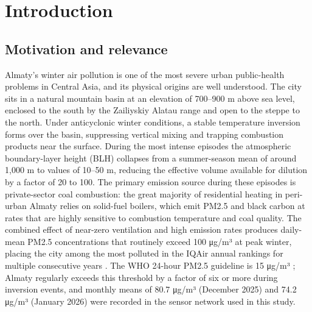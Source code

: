 \section{Introduction}\label{introduction}

\subsection{Motivation and relevance}\label{motivation-and-relevance}

Almaty's winter air pollution is one of the most severe urban public-health problems in Central Asia, and its physical origins are well understood. The city sits in a natural mountain basin at an elevation of 700--900 m above sea level, enclosed to the south by the Zailiyskiy Alatau range and open to the steppe to the north. Under anticyclonic winter conditions, a stable temperature inversion forms over the basin, suppressing vertical mixing and trapping combustion products near the surface. During the most intense episodes the atmospheric boundary-layer height (BLH) collapses from a summer-season mean of around 1,000 m to values of 10--50 m, reducing the effective volume available for dilution by a factor of 20 to 100. The primary emission source during these episodes is private-sector coal combustion: the great majority of residential heating in peri-urban Almaty relies on solid-fuel boilers, which emit PM2.5 and black carbon at rates that are highly sensitive to combustion temperature and coal quality. The combined effect of near-zero ventilation and high emission rates produces daily-mean PM2.5 concentrations that routinely exceed 100 μg/m³ at peak winter, placing the city among the most polluted in the IQAir annual rankings for multiple consecutive years \cite{iqair_world_2024}. The WHO 24-hour PM2.5 guideline is 15 μg/m³ \cite{who_aqg_2021}; Almaty regularly exceeds this threshold by a factor of six or more during inversion events, and monthly means of 80.7 μg/m³ (December 2025) and 74.2 μg/m³ (January 2026) were recorded in the sensor network used in this study.

